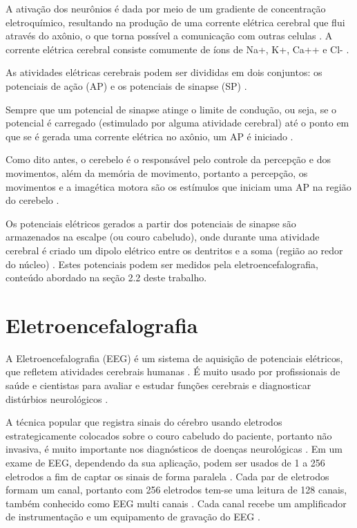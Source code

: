 A ativação dos neurônios é dada por meio de um gradiente de concentração eletroquímico, resultando na produção de uma corrente elétrica cerebral que flui através do axônio, o que torna possível a comunicação com outras celulas \cite{SIULYDissertacao}. A corrente elétrica cerebral consiste comumente de íons de Na+, K+, Ca++ e Cl- \cite{EEGSignals}.

As atividades elétricas cerebrais podem ser divididas em dois conjuntos: os potenciais de ação (AP) e os potenciais de sinapse (SP) \cite{SIULYDissertacao}.

Sempre que um potencial de sinapse atinge o limite de condução, ou seja, se o potencial é carregado (estimulado por alguma atividade cerebral) até o ponto em que se é gerada uma corrente elétrica no axônio, um AP é iniciado \cite{SIULYDissertacao}.

Como dito antes, o cerebelo é o responsável pelo controle da percepção e dos movimentos, além da memória de movimento, portanto a percepção, os movimentos e a imagética motora são os estímulos que iniciam uma AP na região do cerebelo \cite{alvarezneurobiomecanismos}.

Os potenciais elétricos gerados a partir dos potenciais de sinapse são armazenados na escalpe (ou couro cabeludo), onde durante uma atividade cerebral é criado um dipolo elétrico entre os dentritos e a soma (região ao redor do núcleo) \cite{SIULYDissertacao}. Estes potenciais podem ser medidos pela eletroencefalografia, conteúdo abordado na seção 2.2 deste trabalho.

\section{Eletroencefalografia}

A Eletroencefalografia (EEG) é um sistema de aquisição de potenciais elétricos, que refletem atividades cerebrais humanas \cite{Siulybook}. É muito usado por profissionais de saúde e cientistas para avaliar e estudar funções cerebrais e diagnosticar distúrbios neurológicos \cite{Siulybook}.

A técnica popular que registra sinais do cérebro usando eletrodos estrategicamente colocados sobre o couro cabeludo do paciente, portanto não invasiva, é muito importante nos diagnósticos de doenças neurológicas \cite{raobrain}. Em um exame de EEG, dependendo da sua aplicação, podem ser usados de 1 a 256 eletrodos a fim de captar os sinais de forma paralela \cite{raobrain}. Cada par de eletrodos formam um canal, portanto com 256 eletrodos tem-se uma leitura de 128 canais, também conhecido como EEG multi canais \cite{raobrain}. Cada canal recebe um amplificador de instrumentação e um equipamento de gravação do EEG \cite{raobrain}.

